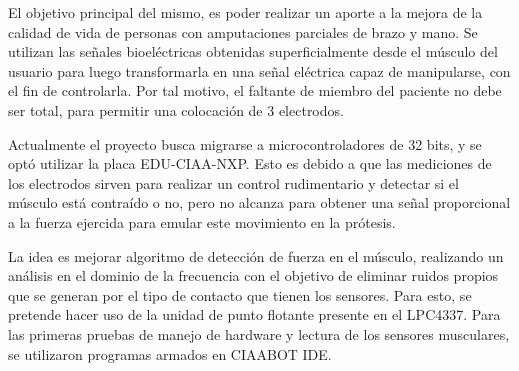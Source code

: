 El objetivo principal del mismo, es poder realizar un aporte a la mejora de la calidad de vida de personas con amputaciones parciales de brazo y mano. Se utilizan las señales bioeléctricas obtenidas superficialmente desde el músculo del usuario para luego transformarla en una señal eléctrica capaz de manipularse, con el fin de controlarla. Por tal motivo, el faltante de miembro del paciente no debe ser total, para permitir una colocación de 3 electrodos.

Actualmente el proyecto busca migrarse a microcontroladores de 32 bits, y se optó utilizar la placa EDU-CIAA-NXP. Esto es debido a que las mediciones de los electrodos sirven para realizar un control rudimentario y detectar si el músculo está contraído o no, pero no alcanza para obtener una señal proporcional a la fuerza ejercida para emular este movimiento en la prótesis.

La idea es mejorar algoritmo de detección de fuerza en el músculo, realizando un análisis en el dominio de la frecuencia con el objetivo de eliminar ruidos propios que se generan por el tipo de contacto que tienen los sensores. Para esto, se pretende hacer uso de la unidad de punto flotante presente en el LPC4337. Para las primeras pruebas de manejo de hardware y lectura de los sensores musculares, se utilizaron programas armados en CIAABOT IDE.
